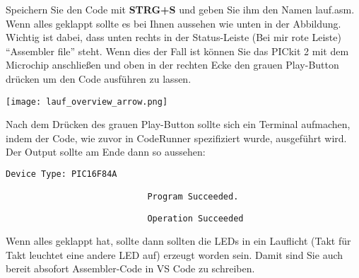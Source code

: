 Speichern Sie den Code mit \textbf{STRG+S} und geben Sie ihm den Namen {\ttfamily lauf.asm}. Wenn alles geklappt sollte es bei Ihnen aussehen wie unten in der Abbildung. Wichtig ist dabei, dass unten rechts in der Status-Leiste (Bei mir rote Leiste) \enquote{Assembler file} steht. Wenn dies der Fall ist können Sie das PICkit 2 mit dem Microchip anschließen und oben in der rechten Ecke den grauen Play-Button drücken um den Code ausführen zu lassen. 
\begin{center}
    \texttt{[image: lauf\_overview\_arrow.png]}
\end{center}
Nach dem Drücken des grauen Play-Button sollte sich ein Terminal aufmachen, indem der Code, wie zuvor in CodeRunner spezifiziert wurde, ausgeführt wird. Der Output sollte am Ende dann so aussehen:
\begin{lstlisting}[language=bash]
                            Device Type: PIC16F84A

                            Program Succeeded.

                            Operation Succeeded 
\end{lstlisting}
Wenn alles geklappt hat, sollte dann sollten die LEDs in ein Lauflicht (Takt für Takt leuchtet eine andere LED auf) erzeugt worden sein. Damit sind Sie auch bereit absofort Assembler-Code in VS Code zu schreiben.